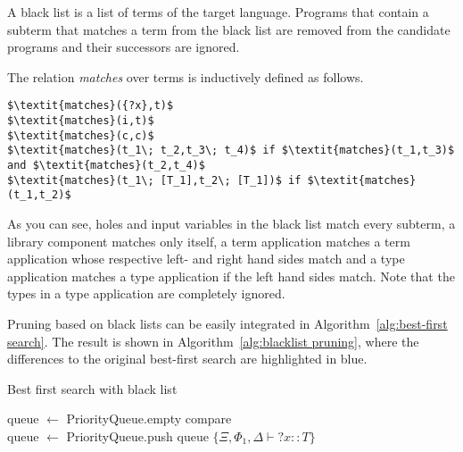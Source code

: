 A black list is a list of terms of the target language. Programs that contain a subterm that matches a term from the black list are removed from the candidate programs and their successors are ignored.

The relation \textit{matches} over terms is inductively defined as follows.
\begin{lstlisting}[style=algorithm]
$\textit{matches}({?x},t)$
$\textit{matches}(i,t)$
$\textit{matches}(c,c)$
$\textit{matches}(t_1\; t_2,t_3\; t_4)$ if $\textit{matches}(t_1,t_3)$ and $\textit{matches}(t_2,t_4)$
$\textit{matches}(t_1\; [T_1],t_2\; [T_1])$ if $\textit{matches}(t_1,t_2)$
\end{lstlisting}

As you can see, holes and input variables in the black list match every subterm, a library component matches only itself, a term application matches a term application whose respective left- and right hand sides match and a type application matches a type application if the left hand sides match. Note that the types in a type application are completely ignored.

Pruning based on black lists can be easily integrated in Algorithm~\ref{alg:best-first search}. The result is shown in Algorithm~\ref{alg:blacklist pruning}, where the differences to the original best-first search are highlighted in blue.

\begin{algorithm}
\caption{Best first search with black list\label{alg:blacklist pruning}}

queue $\gets$ PriorityQueue.empty compare\\
queue $\gets$ PriorityQueue.push queue $\{\Xi, \Phi_1, \Delta \vdash {?x} :: T\}$\\

\end{algorithm}

